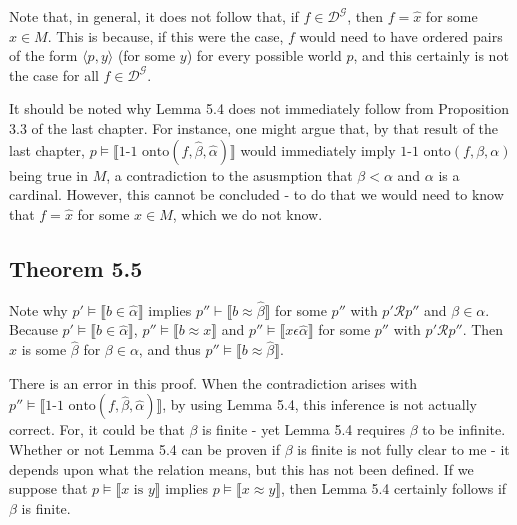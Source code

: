 \documentclass{article}
\newcommand{\lbc}{\llbracket}
\newcommand{\rbc}{\rrbracket}
\theoremstyle{definition}
\begin{document}
Note that, in general, it does not follow that, if $f\in\mathcal{D}^\mathcal{G}$, then $f=\hat{x}$ for some $x\in M$. This is because, 
if this were the case, $f$ would need to have ordered pairs of the form $\langle p,y\rangle$ (for some $y$) for every possible world 
$p$, and this certainly is not the case for all $f\in\mathcal{D}^\mathcal{G}$.

It should be noted why Lemma 5.4 does not immediately follow from Proposition 3.3 of the last chapter. For instance, one might argue that, 
by that result of the last chapter, $p\vDash\lbc\textrm{1-1 onto}(f,\hat{\beta},\hat{\alpha})\rbc$ would immediately imply 
$\textrm{1-1 onto}(f,\beta,\alpha)$ being true in $M$, a contradiction to the asusmption that $\beta<\alpha$ and $\alpha$ is a cardinal. 
However, this cannot be concluded - to do that we would need to know that $f=\hat{x}$ for some $x\in M$, which we do not know.

\subsection*{Theorem 5.5}
Note why $p'\vDash\lbc b\in\hat{\alpha}\rbc$ implies 
$p''\vdash\lbc b\approx\hat{\beta}\rbc$ for some $p''$ with $p'\mathcal{R}p''$ and $\beta\in\alpha$. 
Because $p'\vDash\lbc b\in\hat{\alpha}\rbc$, $p''\vDash\lbc b\approx x\rbc$ and $p''\vDash\lbc x\epsilon\hat{\alpha}\rbc$ for some 
$p''$ with $p'\mathcal{R}p''$. Then $x$ is some $\hat{\beta}$ for $\beta\in\alpha$, and thus $p''\vDash\lbc b\approx\hat{\beta}\rbc$.

There is an error in this proof. When the contradiction arises with $p''\vDash\lbc\textrm{1-1 onto}(f,\hat{\beta},\hat{\alpha})\rbc$, 
by using Lemma 5.4, this inference is not actually correct. For, it could be that $\beta$ is finite - yet Lemma 5.4 requires $\beta$ 
to be infinite. Whether or not Lemma 5.4 can be proven if $\beta$ is finite is not fully clear to me - it depends upon what 
the relation  means, but this has not been defined. If we suppose that $p\vDash\lbc x\textrm{ is }y\rbc$ implies 
$p\vDash\lbc x\approx y\rbc$, then Lemma 5.4 certainly follows if $\beta$ is finite.
\end{document}
